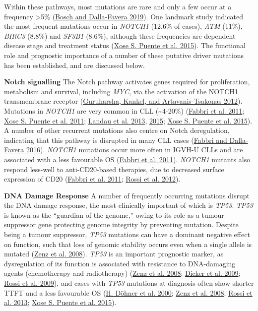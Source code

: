 \documentclass[11pt, a4paper, twosided]{book}
\begin{document}
Within these pathways, most mutations are rare and only a few occur at a frequency \textgreater5\% (\protect\hyperlink{ref-Bosch2019}{Bosch and Dalla-Favera 2019}). One landmark study indicated the most frequent mutations occur in \emph{NOTCH1} (12.6\% of cases), \emph{ATM} (11\%), \emph{BIRC3} (8.8\%) and \emph{SF3B1} (8.6\%), although these frequencies are dependent disease stage and treatment status (\protect\hyperlink{ref-Puente2015}{Xose S. Puente et al. 2015}). The functional role and prognostic importance of a number of these putative driver mutations has been established, and are discussed below.

\textbf{Notch signalling}
The Notch pathway activates genes required for proliferation, metabolism and survival, including \emph{MYC}, via the activation of the NOTCH1 transmembrane receptor (\protect\hyperlink{ref-Guruharsha2012}{Guruharsha, Kankel, and Artavanis-Tsakonas 2012}). Mutations in \emph{NOTCH1} are very common in CLL (\textasciitilde4-20\%) (\protect\hyperlink{ref-Fabbri2011}{Fabbri et al. 2011}; \protect\hyperlink{ref-Puente2011}{Xose S. Puente et al. 2011}; \protect\hyperlink{ref-Landau2013}{Landau et al. 2013}, \protect\hyperlink{ref-Landau2015}{2015}; \protect\hyperlink{ref-Puente2015}{Xose S. Puente et al. 2015}). A number of other recurrent mutations also centre on Notch deregulation, indicating that this pathway is disrupted in many CLL cases (\protect\hyperlink{ref-Fabbri2016}{Fabbri and Dalla-Favera 2016}). \emph{NOTCH1} mutations occur more often in IGVH-U CLLs and are associated with a less favourable OS (\protect\hyperlink{ref-Fabbri2011}{Fabbri et al. 2011}). \emph{NOTCH1} mutants also respond less-well to anti-CD20-based therapies, due to decreased surface expression of CD20 (\protect\hyperlink{ref-Fabbri2011}{Fabbri et al. 2011}; \protect\hyperlink{ref-Rossi2012}{Rossi et al. 2012}).

\textbf{DNA Damage Response}
A number of frequently occurring mutations disrupt the DNA damage response, the most clinically important of which is \emph{TP53}. \emph{TP53} is known as the ``guardian of the genome,'' owing to its role as a tumour suppressor gene protecting genome integrity by preventing mutation. Despite being a tumour suppressor, \emph{TP53} mutations can have a dominant negative effect on function, such that loss of genomic stability occurs even when a single allele is mutated (\protect\hyperlink{ref-Zenz2008}{Zenz et al. 2008}). \emph{TP53} is an important prognostic marker, as dysregulation of its function is associated with resistance to DNA-damaging agents (chemotherapy and radiotherapy) (\protect\hyperlink{ref-Zenz2008}{Zenz et al. 2008}; \protect\hyperlink{ref-Dicker2009}{Dicker et al. 2009}; \protect\hyperlink{ref-Rossi2009}{Rossi et al. 2009}), and cases with \emph{TP53} mutations at diagnosis often show shorter TTFT and a less favourable OS (\protect\hyperlink{ref-Dohner2000}{H. Döhner et al. 2000}; \protect\hyperlink{ref-Zenz2008}{Zenz et al. 2008}; \protect\hyperlink{ref-Rossi2013}{Rossi et al. 2013}; \protect\hyperlink{ref-Puente2015}{Xose S. Puente et al. 2015}).
\end{document}
